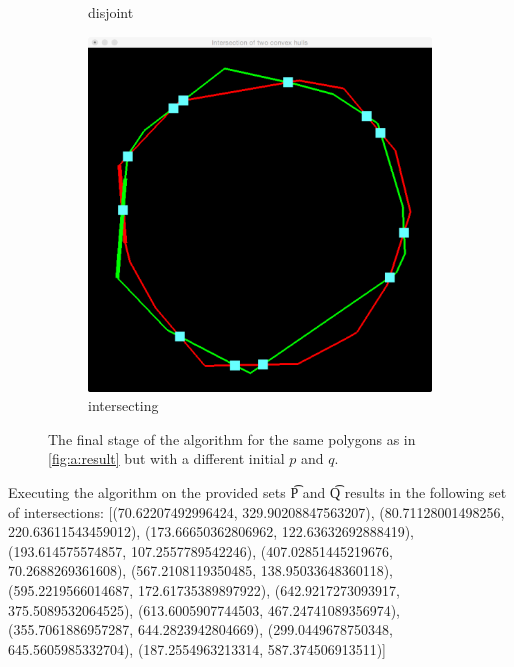 \begin{figure}
\begin{subfigure}{0.3\textwidth}
			\caption{disjoint}
			\label{subfig:a:results:disjoint_2}			
		\end{subfigure}		
		\begin{subfigure}{0.3\textwidth}
			\includegraphics[width=\textwidth]{./img/a_intersecting_2}
			\caption{intersecting}
			\label{subfig:a:results:intersecting_2}			
		\end{subfigure}				
		\caption{The final stage of the algorithm for the same polygons as in \autoref{fig:a:result} but with a different initial $p$ and $q$.}
		\label{fig:a:result_2}
	\end{figure}

	Executing the algorithm on the provided sets \t{P} and \t{Q} results in the following set of intersections:
	[(\num{70.62207492996424}, \num{329.90208847563207}), (\num{80.71128001498256}, \num{220.63611543459012}), (\num{173.66650362806962}, \num{122.63632692888419}), (\num{193.614575574857}, \num{107.2557789542246}), (\num{407.02851445219676}, \num{70.2688269361608}), (\num{567.2108119350485}, \num{138.95033648360118}), (\num{595.2219566014687}, \num{172.61735389897922}), (\num{642.9217273093917}, \num{375.5089532064525}), (\num{613.6005907744503}, \num{467.24741089356974}), (\num{355.7061886957287}, \num{644.2823942804669}), (\num{299.0449678750348}, \num{645.5605985332704}), (\num{187.2554963213314}, \num{587.374506913511})]
